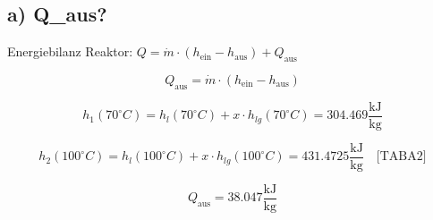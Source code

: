 \subsection*{a) Q\_aus?}

Energiebilanz Reaktor: \( Q = \dot{m} \cdot (h_{\text{ein}} - h_{\text{aus}}) + Q_{\text{aus}} \)

\[
Q_{\text{aus}} = \dot{m} \cdot (h_{\text{ein}} - h_{\text{aus}})
\]

\[
h_1 (70^\circ C) = h_l (70^\circ C) + x \cdot h_{lg} (70^\circ C) = 304.469 \frac{\text{kJ}}{\text{kg}}
\]

\[
h_2 (100^\circ C) = h_l (100^\circ C) + x \cdot h_{lg} (100^\circ C) = 431.4725 \frac{\text{kJ}}{\text{kg}} \quad \text{[TABA2]}
\]

\[
Q_{\text{aus}} = 38.047 \frac{\text{kJ}}{\text{kg}}
\]